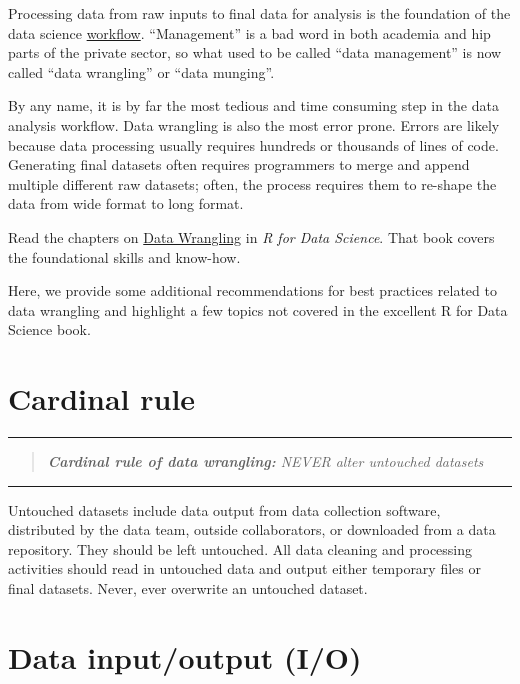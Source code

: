 \documentclass[
]{book}
\begin{document}
Processing data from raw inputs to final data for analysis is the foundation of the data science \protect\hyperlink{workflows}{workflow}. ``Management'' is a bad word in both academia and hip parts of the private sector, so what used to be called ``data management'' is now called ``data wrangling'' or ``data munging''.

By any name, it is by far the most tedious and time consuming step in the data analysis workflow. Data wrangling is also the most error prone. Errors are likely because data processing usually requires hundreds or thousands of lines of code. Generating final datasets often requires programmers to merge and append multiple different raw datasets; often, the process requires them to re-shape the data from wide format to long format.

Read the chapters on \href{https://r4ds.had.co.nz/}{Data Wrangling} in \emph{R for Data Science}. That book covers the foundational skills and know-how.

Here, we provide some additional recommendations for best practices related to data wrangling and highlight a few topics not covered in the excellent R for Data Science book.

\hypertarget{cardinal-rule}{%
\section{Cardinal rule}\label{cardinal-rule}}

\begin{center}\rule{0.5\linewidth}{\linethickness}\end{center}

\begin{quote}
\emph{\textbf{Cardinal rule of data wrangling:} NEVER alter untouched datasets}
\end{quote}

\begin{center}\rule{0.5\linewidth}{\linethickness}\end{center}

Untouched datasets include data output from data collection software, distributed by the data team, outside collaborators, or downloaded from a data repository. They should be left untouched. All data cleaning and processing activities should read in untouched data and output either temporary files or final datasets. Never, ever overwrite an untouched dataset.

\hypertarget{data-inputoutput-io}{%
\section{Data input/output (I/O)}\label{data-inputoutput-io}}
\end{document}

